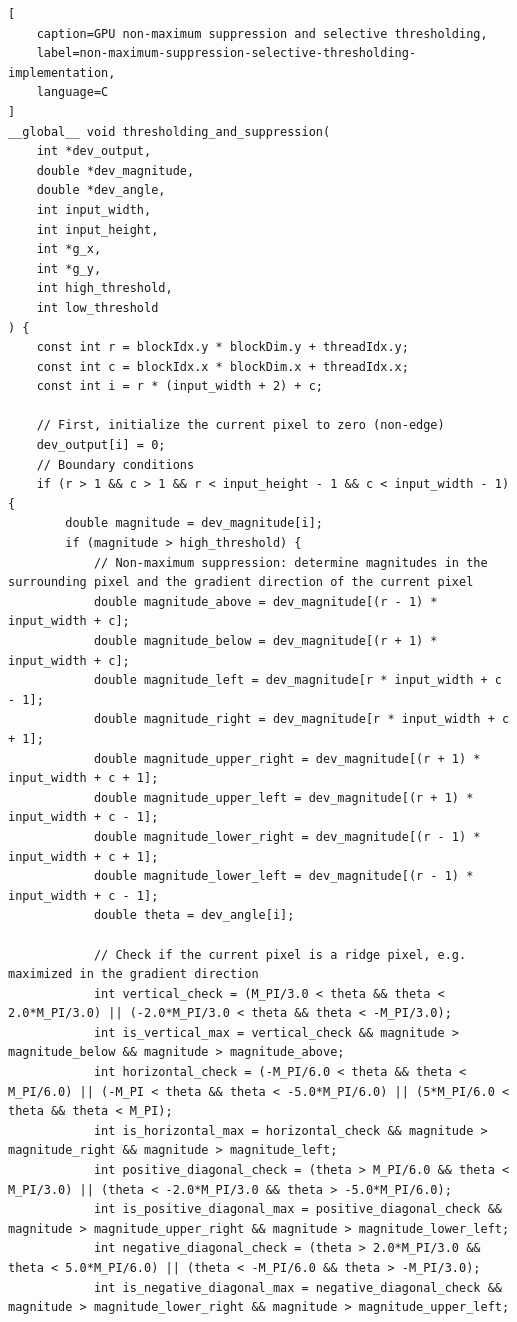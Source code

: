 \documentclass[journal]{IEEEtran}
\begin{document}
\begin{lstlisting}[
	caption=GPU non-maximum suppression and selective thresholding,
	label=non-maximum-suppression-selective-thresholding-implementation,
	language=C
]
__global__ void thresholding_and_suppression(
	int *dev_output,
	double *dev_magnitude,
	double *dev_angle,
	int input_width,
	int input_height,
	int *g_x,
	int *g_y,
	int high_threshold,
	int low_threshold
) {
	const int r = blockIdx.y * blockDim.y + threadIdx.y;
	const int c = blockIdx.x * blockDim.x + threadIdx.x;
    const int i = r * (input_width + 2) + c;

    // First, initialize the current pixel to zero (non-edge)
    dev_output[i] = 0;
    // Boundary conditions
    if (r > 1 && c > 1 && r < input_height - 1 && c < input_width - 1) {
        double magnitude = dev_magnitude[i];
        if (magnitude > high_threshold) {
        	// Non-maximum suppression: determine magnitudes in the surrounding pixel and the gradient direction of the current pixel
        	double magnitude_above = dev_magnitude[(r - 1) * input_width + c];
			double magnitude_below = dev_magnitude[(r + 1) * input_width + c];
			double magnitude_left = dev_magnitude[r * input_width + c - 1];
			double magnitude_right = dev_magnitude[r * input_width + c + 1];
			double magnitude_upper_right = dev_magnitude[(r + 1) * input_width + c + 1];
			double magnitude_upper_left = dev_magnitude[(r + 1) * input_width + c - 1];
			double magnitude_lower_right = dev_magnitude[(r - 1) * input_width + c + 1];
			double magnitude_lower_left = dev_magnitude[(r - 1) * input_width + c - 1];
			double theta = dev_angle[i];
		
			// Check if the current pixel is a ridge pixel, e.g. maximized in the gradient direction
			int vertical_check = (M_PI/3.0 < theta && theta < 2.0*M_PI/3.0) || (-2.0*M_PI/3.0 < theta && theta < -M_PI/3.0);
			int is_vertical_max = vertical_check && magnitude > magnitude_below && magnitude > magnitude_above;
			int horizontal_check = (-M_PI/6.0 < theta && theta < M_PI/6.0) || (-M_PI < theta && theta < -5.0*M_PI/6.0) || (5*M_PI/6.0 < theta && theta < M_PI);
			int is_horizontal_max = horizontal_check && magnitude > magnitude_right && magnitude > magnitude_left;
	        int positive_diagonal_check = (theta > M_PI/6.0 && theta < M_PI/3.0) || (theta < -2.0*M_PI/3.0 && theta > -5.0*M_PI/6.0);
			int is_positive_diagonal_max = positive_diagonal_check && magnitude > magnitude_upper_right && magnitude > magnitude_lower_left;
			int negative_diagonal_check = (theta > 2.0*M_PI/3.0 && theta < 5.0*M_PI/6.0) || (theta < -M_PI/6.0 && theta > -M_PI/3.0);
			int is_negative_diagonal_max = negative_diagonal_check && magnitude > magnitude_lower_right && magnitude > magnitude_upper_left;
		

\end{lstlisting}
\end{document}
